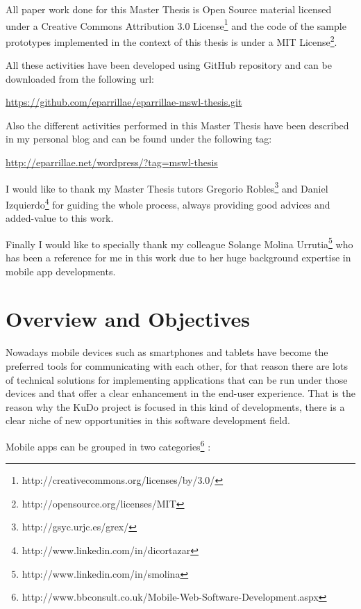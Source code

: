 \documentclass[a4paper,12pt]{book}
\begin{document}
All paper work done for this Master Thesis is Open Source material licensed under a Creative Commons Attribution 3.0 License\footnote{http://creativecommons.org/licenses/by/3.0/} and the code of the sample prototypes implemented in the context of this thesis is under a MIT License\footnote{http://opensource.org/licenses/MIT}.

All these activities have been developed using GitHub repository and can be downloaded from the following url:

\url{
https://github.com/eparrillae/eparrillae-mswl-thesis.git}

Also the different activities performed in this Master Thesis have been described in my personal blog and can be found under the following tag:

\url{
http://eparrillae.net/wordpress/?tag=mswl-thesis}

I would like to thank my Master Thesis tutors Gregorio Robles\footnote{http://gsyc.urjc.es/grex/} and Daniel Izquierdo\footnote{http://www.linkedin.com/in/dicortazar} for guiding the whole process, always providing good advices and added-value to this work.

Finally I would like to specially thank my colleague Solange Molina Urrutia\footnote{http://www.linkedin.com/in/smolina} who has been a reference for me in this work due to her huge background expertise in mobile app developments.  


\chapter{Overview and Objectives}
\label{chap:overview}

Nowadays mobile devices such as smartphones and tablets have become the preferred tools for communicating with each other, for that reason there are lots of technical solutions for implementing applications that can be run under those devices and that offer a clear enhancement in the end-user experience. That is the reason why the KuDo project is focused in this kind of developments, there is a clear niche of new opportunities in this software development field.

Mobile apps can be grouped in two categories\footnote{http://www.bbconsult.co.uk/Mobile-Web-Software-Development.aspx} :
\end{document}
